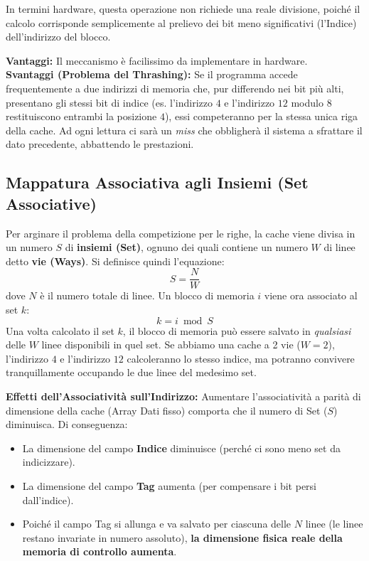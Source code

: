 In termini hardware, questa operazione non richiede una reale divisione, poiché il calcolo corrisponde semplicemente al prelievo dei bit meno significativi (l'Indice) dell'indirizzo del blocco.

\textbf{Vantaggi:} Il meccanismo è facilissimo da implementare in hardware. \\
\textbf{Svantaggi (Problema del Thrashing):} Se il programma accede frequentemente a due indirizzi di memoria che, pur differendo nei bit più alti, presentano gli stessi bit di indice (es. l'indirizzo $4$ e l'indirizzo $12$ modulo $8$ restituiscono entrambi la posizione $4$), essi competeranno per la stessa unica riga della cache. Ad ogni lettura ci sarà un \textit{miss} che obbligherà il sistema a sfrattare il dato precedente, abbattendo le prestazioni.

\subsection{Mappatura Associativa agli Insiemi (Set Associative)}
Per arginare il problema della competizione per le righe, la cache viene divisa in un numero $S$ di \textbf{insiemi (Set)}, ognuno dei quali contiene un numero $W$ di linee detto \textbf{vie (Ways)}. 
Si definisce quindi l'equazione:
\[S = \frac{N}{W}\]
dove $N$ è il numero totale di linee. Un blocco di memoria $i$ viene ora associato al set $k$:
\[k = i \bmod S\]
Una volta calcolato il set $k$, il blocco di memoria può essere salvato in \textit{qualsiasi} delle $W$ linee disponibili in quel set. Se abbiamo una cache a 2 vie ($W=2$), l'indirizzo $4$ e l'indirizzo $12$ calcoleranno lo stesso indice, ma potranno convivere tranquillamente occupando le due linee del medesimo set.


\textbf{Effetti dell'Associatività sull'Indirizzo:}
Aumentare l'associatività a parità di dimensione della cache (Array Dati fisso) comporta che il numero di Set ($S$) diminuisca.
Di conseguenza:
\begin{itemize}
    \item La dimensione del campo \textbf{Indice} diminuisce (perché ci sono meno set da indicizzare).
    \item La dimensione del campo \textbf{Tag} aumenta (per compensare i bit persi dall'indice).
    \item Poiché il campo Tag si allunga e va salvato per ciascuna delle $N$ linee (le linee restano invariate in numero assoluto), \textbf{la dimensione fisica reale della memoria di controllo aumenta}.
\end{itemize}

